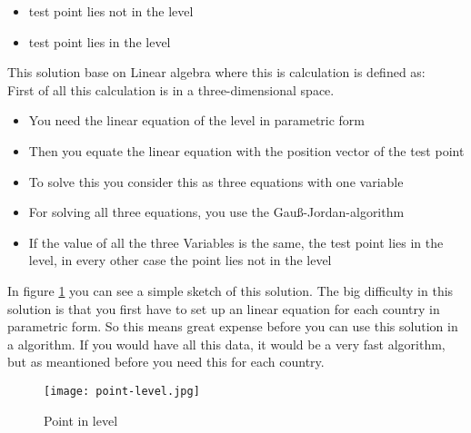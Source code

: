 \documentclass[12pt,a4paper]{scrreprt}
\begin{document}
\vspace{0.1cm}
\begin{itemize}
\item test point lies not in the level 
\item test point lies in the level
\end{itemize}
\vspace{0.1cm}

This solution base on Linear algebra where this is calculation is defined as:\\

\vspace{0.5cm}
First of all this calculation is in a three-dimensional space.

\begin{itemize}
\item[1.)] You need the linear equation of the level in parametric form
\item[2.)] Then you equate the linear equation with the position vector of the test point
\item[3.)] To solve this you consider this as three equations with one variable
\item[4.)] For solving all three equations, you use the Gauß-Jordan-algorithm
\item[5.)] If the value of all the three Variables is the same, the test point lies in the level, in every other case the point lies not in the level
\end{itemize}
In figure \ref{pointInLevel} you can see a simple sketch of this solution. The big difficulty in this solution is that you first have to set up an linear equation for each country in parametric form. So this means great expense before you can use this solution in a algorithm. If you would have all this data, it would be a very fast algorithm, but as meantioned before you need this for each country.


\begin{figure}[b] 
\centering
\texttt{[image: point-level.jpg]}
\renewcommand{\figurename}{Fig.}
\caption{Point in level} 
\label{pointInLevel}
\end{figure}

\newpage
\end{document}
